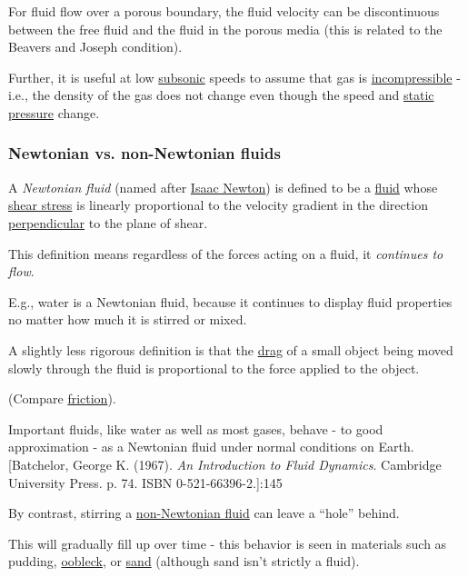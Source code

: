 \documentclass{article}
\begin{document}
%
For fluid flow over a porous boundary, the fluid velocity can be discontinuous between the free fluid and the fluid in the porous media (this is related to the Beavers and Joseph condition).

Further, it is useful at low \href{https://en.wikipedia.org/wiki/Speed_of_sound}{subsonic} speeds to assume that gas is \href{https://en.wikipedia.org/wiki/Incompressible_fluid}{incompressible} - i.e., the density of the gas does not change even though the speed and \href{https://en.wikipedia.org/wiki/Static_pressure}{static pressure} change.

\subsubsection{Newtonian vs. non-Newtonian fluids}
A \textit{Newtonian fluid} (named after \href{https://en.wikipedia.org/wiki/Isaac_Newton}{Isaac Newton}) is defined to be a \href{https://en.wikipedia.org/wiki/Fluid}{fluid} whose \href{https://en.wikipedia.org/wiki/Shear_stress}{shear stress} is linearly proportional to the velocity gradient in the direction \href{https://en.wikipedia.org/wiki/Perpendicular}{perpendicular} to the plane of shear.

This definition means regardless of the forces acting on a fluid, it \textit{continues to flow}.

E.g., water is a Newtonian fluid, because it continues to display fluid properties no matter how much it is stirred or mixed.

A slightly less rigorous definition is that the \href{https://en.wikipedia.org/wiki/Drag_(physics)}{drag} of a small object being moved slowly through the fluid is proportional to the force applied to the object.

(Compare \href{https://en.wikipedia.org/wiki/Friction}{friction}).

Important fluids, like water as well as most gases, behave - to good approximation - as a Newtonian fluid under normal conditions on Earth.[Batchelor, George K. (1967). \textit{An Introduction to Fluid Dynamics}. Cambridge University Press. p. 74. ISBN 0-521-66396-2.]:145

%
By contrast, stirring a \href{https://en.wikipedia.org/wiki/Non-Newtonian_fluid}{non-Newtonian fluid} can leave a ``hole'' behind.

This will gradually fill up over time - this behavior is seen in materials such as pudding, \href{https://en.wikipedia.org/wiki/Non-newtonian_fluid#Oobleck}{oobleck}, or \href{https://en.wikipedia.org/wiki/Sand}{sand} (although sand isn't strictly a fluid).
\end{document}

